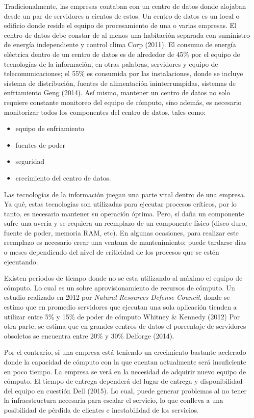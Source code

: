 \documentclass[12pt,twoside]{reedthesis}
\providecommand{\tightlist}{%
  \setlength{\itemsep}{0pt}\setlength{\parskip}{0pt}}
\theoremstyle{definition}
\theoremstyle{definition}
\theoremstyle{definition}
\theoremstyle{remark}
\begin{document}
Tradicionalmente, las empresas contaban con un centro de datos donde
alojaban desde un par de servidores a cientos de estos. Un centro de
datos es un local o edificio donde reside el equipo de procesamiento de
una o varias empresas. El centro de datos debe constar de al menos una
habitación separada con suministro de energía independiente y control
clima Corp (2011). El consumo de energía eléctrica dentro de un centro
de datos es de alrededor de 45\% por el equipo de tecnologías de la
información, en otras palabras, servidores y equipo de
telecomunicaciones; el 55\% es consumida por las instalaciones, donde se
incluye sistema de distribución, fuentes de alimentación
ininterrumpidas, sistemas de enfriamiento Geng (2014). Así mismo,
mantener un centro de datos no solo requiere constante monitoreo del
equipo de cómputo, sino además, es necesario monitorizar todos los
componentes del centro de datos, tales como:
\begin{itemize}
\tightlist
\item
  equipo de enfriamiento
\item
  fuentes de poder
\item
  seguridad
\item
  crecimiento del centro de datos.
\end{itemize}
Las tecnologías de la información juegan una parte vital dentro de una
empresa. Ya qué, estas tecnologías son utilizadas para ejecutar procesos
críticos, por lo tanto, es necesario mantener su operación óptima. Pero,
sí daña un componente sufre una avería y se requiera un reemplazo de un
componente físico (disco duro, fuente de poder, memoria RAM, etc). En
algunas ocasiones, para realizar este reemplazo es necesario crear una
ventana de mantenimiento; puede tardarse días o meses dependiendo del
nivel de criticidad de los procesos que se estén ejecutando.

Existen periodos de tiempo donde no se esta utilizando al máximo el
equipo de cómputo. Lo cual es un sobre aprovisionamiento de recursos de
cómputo. Un estudio realizado en 2012 por \emph{Natural Resources
Defense Council}, donde se estimo que en promedio servidores que
ejecutan una sola aplicación tienden a utilizar entre 5\% y 15\% de
poder de cómputo Whitney \& Kennedy (2012) Por otra parte, se estima que
en grandes centros de datos el porcentaje de servidores obsoletos se
encuentra entre 20\% y 30\% Delforge (2014).

Por el contrario, si una empresa está teniendo un crecimiento bastante
acelerado donde la capacidad de cómputo con la que cuentan actualmente
será insuficiente en poco tiempo. La empresa se verá en la necesidad de
adquirir nuevo equipo de cómputo. El tiempo de entrega dependerá del
lugar de entrega y disponibilidad del equipo en cuestión Dell (2015). Lo
cual, puede generar problemas al no tener la infraestructura necesaria
para escalar el servicio, lo que conlleva a una posibilidad de pérdida
de clientes e inestabilidad de los servicios.
\end{document}
